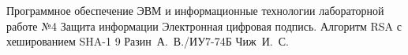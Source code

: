 \documentclass{bmstu}
\begin{document}
	
	{Программное обеспечение ЭВМ и информационные технологии}
	{лабораторной работе №4}
	{Защита информации}
	{Электронная цифровая подпись. Алгоритм RSA с хешированием SHA-1}
	{9}
	{Разин~А.~В./ИУ7-74Б}
	{Чиж~И.~С.}
	
	\maketableofcontents
	
	
	
	
	
	
	
	\makebibliography
	
\end{document}
